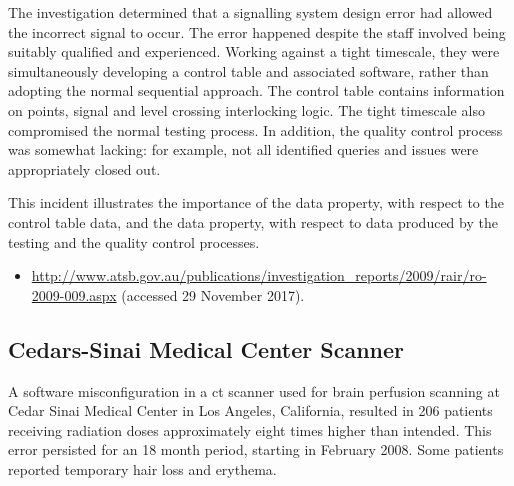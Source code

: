 The investigation determined that a signalling system design error had allowed the incorrect signal to occur. The error happened despite the staff involved being suitably qualified and experienced. Working against a tight timescale, they were simultaneously developing a control table and associated software, rather than adopting the normal sequential approach. The control table contains \gls{information} on points, signal and level crossing interlocking logic. The tight timescale also compromised the normal testing process. In addition, the quality control process was somewhat lacking: for example, not all identified queries and issues were appropriately closed out.

This incident illustrates the importance of the  \gls{data property}, with respect to the control table data, and the  \gls{data property}, with respect to data produced by the testing and the quality control processes.

\begin{samepage}
\begin{itemize}
	\item \raggedright{\href{http://www.atsb.gov.au/publications/investigation_reports/2009/rair/ro-2009-009.aspx}{http://www.atsb.gov.au/publications/investigation\_reports/2009/rair/ro-2009-009.aspx} (accessed 29 November 2017).}
\end{itemize}
\end{samepage}


\subsection{\protect Cedars-Sinai Medical Center\protect{} Scanner} \label{bkm:incacc:cedarssinai}
A software misconfiguration in a \gls{ct} scanner used for brain perfusion scanning at Cedar Sinai Medical Center in Los Angeles, California, resulted in 206 patients receiving radiation doses approximately eight times higher than intended. This error persisted for an 18 month period, starting in February 2008. Some patients reported temporary hair loss and erythema. 

